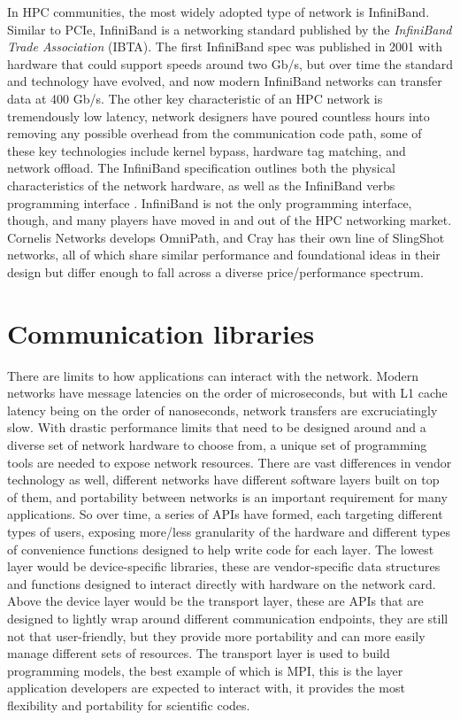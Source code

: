 In HPC communities, the most widely adopted type of network is InfiniBand. 
Similar to PCIe, InfiniBand is a networking standard published by the \textit{InfiniBand Trade Association} (IBTA).
The first InfiniBand spec was published in 2001 with hardware that could support speeds around two Gb/s, but over time the standard and technology have evolved, and now modern InfiniBand networks can transfer data at 400 Gb/s.
The other key characteristic of an HPC network is tremendously low latency, network designers have poured countless hours into removing any possible overhead from the communication code path, some of these key technologies include kernel bypass, hardware tag matching, and network offload.
The InfiniBand specification outlines both the physical characteristics of the network hardware, as well as the InfiniBand verbs programming interface \cite{IBSpec}.
InfiniBand is not the only programming interface, though, and many players have moved in and out of the HPC networking market.
Cornelis Networks develops OmniPath, and Cray has their own line of SlingShot networks, all of which share similar performance and foundational ideas in their design but differ enough to fall across a diverse price/performance spectrum.

\section{Communication libraries} 

There are limits to how applications can interact with the network.
Modern networks have message latencies on the order of microseconds, but with L1 cache latency being on the order of nanoseconds, network transfers are excruciatingly slow.
With drastic performance limits that need to be designed around and a diverse set of network hardware to choose from, a unique set of programming tools are needed to expose network resources. 
There are vast differences in vendor technology as well, different networks have different software layers built on top of them, and portability between networks is an important requirement for many applications. 
So over time, a series of APIs have formed, each targeting different types of users, exposing more/less granularity of the hardware and different types of convenience functions designed to help write code for each layer.
The lowest layer would be device-specific libraries, these are vendor-specific data structures and functions designed to interact directly with hardware on the network card.
Above the device layer would be the transport layer, these are APIs that are designed to lightly wrap around different communication endpoints, they are still not that user-friendly, but they provide more portability and can more easily manage different sets of resources.
The transport layer is used to build programming models, the best example of which is MPI, this is the layer application developers are expected to interact with, it provides the most flexibility and portability for scientific codes.

